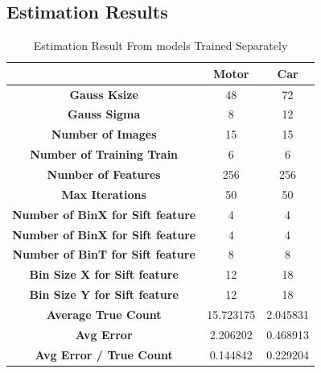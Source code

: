 \subsection{Estimation Results}
  \begin{table}[H]
    \begin{center}
      \begin{tabular}{ | c | c | c |} 
        \hline
        & \textbf{Motor} & \textbf{Car} \\
        \hline
        \textbf{Gauss Ksize} &  48 &  72 \\
        \hline
        \textbf{Gauss Sigma} &  8 &  12 \\
        \hline
        \textbf{Number of Images} &  15 &  15 \\
        \hline
        \textbf{Number of Training Train} &  6 &  6 \\
        \hline
        \textbf{Number of Features} &  256 &  256 \\
        \hline
        \textbf{Max Iterations} &  50 &  50 \\
        \hline
        \textbf{Number of BinX for Sift feature} &  4 &  4 \\
        \hline
        \textbf{Number of BinX for Sift feature} &  4 &  4 \\
        \hline
        \textbf{Number of BinT for Sift feature} &  8 &  8 \\
        \hline
        \textbf{Bin Size X for Sift feature} &  12 &  18 \\
        \hline
        \textbf{Bin Size Y for Sift feature} &  12 &  18 \\
        \hline
         \textbf{Average True Count} & 15.723175 & 2.045831 \\
         \hline
         \textbf{Avg Error} & 2.206202 & 0.468913 \\
         \hline
         \textbf{Avg Error / True Count } & 0.144842 & 0.229204 \\
       \hline
      \end{tabular}
    \end{center}
    \caption{Estimation Result From models Trained Separately}\label{tab:data}
  \end{table}

